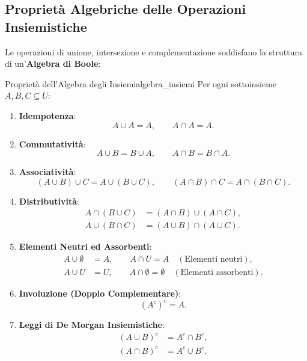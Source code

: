 \subsection{Proprietà Algebriche delle Operazioni Insiemistiche}

Le operazioni di unione, intersezione e complementazione soddisfano la struttura di un'\textbf{Algebra di Boole}:

\begin{teorema}{Proprietà dell'Algebra degli Insiemi}{algebra_insiemi}
Per ogni sottoinsieme $A, B, C \subseteq U$:
\begin{enumerate}
    \item \textbf{Idempotenza}:
    \begin{equation}
        A \cup A = A, \qquad A \cap A = A.
    \end{equation}
    \item \textbf{Commutatività}:
    \begin{equation}
        A \cup B = B \cup A, \qquad A \cap B = B \cap A.
    \end{equation}
    \item \textbf{Associatività}:
    \begin{equation}
        (A \cup B) \cup C = A \cup (B \cup C), \qquad (A \cap B) \cap C = A \cap (B \cap C).
    \end{equation}
    \item \textbf{Distributività}:
    \begin{align}
        A \cap (B \cup C) &= (A \cap B) \cup (A \cap C), \\
        A \cup (B \cap C) &= (A \cup B) \cap (A \cup C).
    \end{align}
    \item \textbf{Elementi Neutri ed Assorbenti}:
    \begin{align}
        A \cup \emptyset &= A, \qquad A \cap U = A \quad (\text{Elementi neutri}), \\
        A \cup U &= U, \qquad A \cap \emptyset = \emptyset \quad (\text{Elementi assorbenti}).
    \end{align}
    \item \textbf{Involuzione (Doppio Complementare)}:
    \begin{equation}
        (A^c)^c = A.
    \end{equation}
    \item \textbf{Leggi di De Morgan Insiemistiche}:
    \begin{align}
        (A \cup B)^c &= A^c \cap B^c, \label{eq:demorgan_unione} \\
        (A \cap B)^c &= A^c \cup B^c. \label{eq:demorgan_intersezione}
    \end{align}
\end{enumerate}
\end{teorema}

